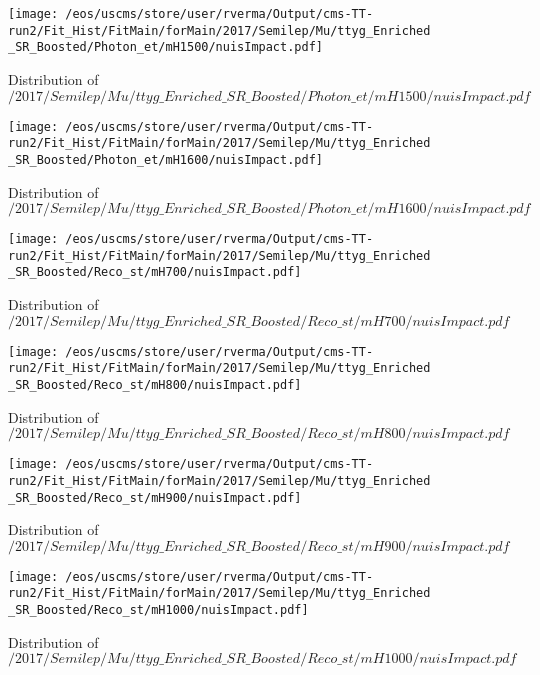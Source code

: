 \begin{figure}
\centering
\texttt{[image: /eos/uscms/store/user/rverma/Output/cms-TT-run2/Fit\_Hist/FitMain/forMain/2017/Semilep/Mu/ttyg\_Enriched\_SR\_Boosted/Photon\_et/mH1500/nuisImpact.pdf]}
\caption{Distribution of $/2017/Semilep/Mu/ttyg\_Enriched\_SR\_Boosted/Photon\_et/mH1500/nuisImpact.pdf$}
\end{figure}

\begin{figure}
\centering
\texttt{[image: /eos/uscms/store/user/rverma/Output/cms-TT-run2/Fit\_Hist/FitMain/forMain/2017/Semilep/Mu/ttyg\_Enriched\_SR\_Boosted/Photon\_et/mH1600/nuisImpact.pdf]}
\caption{Distribution of $/2017/Semilep/Mu/ttyg\_Enriched\_SR\_Boosted/Photon\_et/mH1600/nuisImpact.pdf$}
\end{figure}

\begin{figure}
\centering
\texttt{[image: /eos/uscms/store/user/rverma/Output/cms-TT-run2/Fit\_Hist/FitMain/forMain/2017/Semilep/Mu/ttyg\_Enriched\_SR\_Boosted/Reco\_st/mH700/nuisImpact.pdf]}
\caption{Distribution of $/2017/Semilep/Mu/ttyg\_Enriched\_SR\_Boosted/Reco\_st/mH700/nuisImpact.pdf$}
\end{figure}

\begin{figure}
\centering
\texttt{[image: /eos/uscms/store/user/rverma/Output/cms-TT-run2/Fit\_Hist/FitMain/forMain/2017/Semilep/Mu/ttyg\_Enriched\_SR\_Boosted/Reco\_st/mH800/nuisImpact.pdf]}
\caption{Distribution of $/2017/Semilep/Mu/ttyg\_Enriched\_SR\_Boosted/Reco\_st/mH800/nuisImpact.pdf$}
\end{figure}

\begin{figure}
\centering
\texttt{[image: /eos/uscms/store/user/rverma/Output/cms-TT-run2/Fit\_Hist/FitMain/forMain/2017/Semilep/Mu/ttyg\_Enriched\_SR\_Boosted/Reco\_st/mH900/nuisImpact.pdf]}
\caption{Distribution of $/2017/Semilep/Mu/ttyg\_Enriched\_SR\_Boosted/Reco\_st/mH900/nuisImpact.pdf$}
\end{figure}

\begin{figure}
\centering
\texttt{[image: /eos/uscms/store/user/rverma/Output/cms-TT-run2/Fit\_Hist/FitMain/forMain/2017/Semilep/Mu/ttyg\_Enriched\_SR\_Boosted/Reco\_st/mH1000/nuisImpact.pdf]}
\caption{Distribution of $/2017/Semilep/Mu/ttyg\_Enriched\_SR\_Boosted/Reco\_st/mH1000/nuisImpact.pdf$}
\end{figure}

